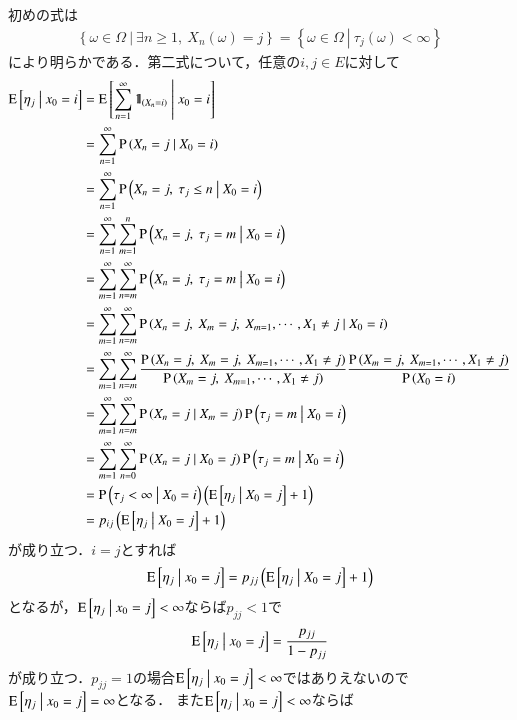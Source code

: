 	\begin{prf}
		初めの式は
		\begin{align}
			\left\{ \omega \in \Omega\ \left|\ \exists n \geq 1,\ X_n(\omega) = j \right.\right\} = \left\{ \omega \in \Omega\ \left|\ \tau_j(\omega) < \infty \right.\right\}
		\end{align}
		により明らかである．第二式について，任意の$i,j \in E$に対して
		\begin{align}
			\cexp{\eta_j}{x_0 = i} &= \cexp{\sum_{n=1}^{\infty} \defunc_{(X_n = i)} }{x_0 = i} \\
			&= \sum_{n=1}^{\infty} \cprob{X_n = j}{X_0 = i} \\
			&= \sum_{n=1}^{\infty} \cprob{X_n = j,\ \tau_j \leq n}{X_0 = i} \\
			&= \sum_{n=1}^{\infty} \sum_{m=1}^{n} \cprob{X_n = j,\ \tau_j = m}{X_0 = i} \\
			&= \sum_{m=1}^{\infty} \sum_{n=m}^{\infty} \cprob{X_n = j,\ \tau_j = m}{X_0 = i} \\
			&= \sum_{m=1}^{\infty} \sum_{n=m}^{\infty} \cprob{X_n = j,\ X_m = j,\ X_{m=1},\cdots,X_1 \neq j}{X_0 = i} \\
			&= \sum_{m=1}^{\infty} \sum_{n=m}^{\infty} \frac{\prob{X_n = j,\ X_m = j,\ X_{m=1},\cdots,X_1 \neq j}}{\prob{X_m = j,\ X_{m=1},\cdots,X_1 \neq j}}
				\frac{\prob{X_m = j,\ X_{m=1},\cdots,X_1 \neq j}}{\prob{X_0 = i}} \\
			&= \sum_{m=1}^{\infty} \sum_{n=m}^{\infty} \cprob{X_n = j}{X_m = j} \cprob{\tau_j = m}{X_0 = i} \\
			&= \sum_{m=1}^{\infty} \sum_{n=0}^{\infty} \cprob{X_n = j}{X_0 = j} \cprob{\tau_j = m}{X_0 = i} \\
			&= \cprob{\tau_j < \infty}{X_0 = i} \left( \cexp{\eta_j}{X_0 = j} + 1 \right) \\
			&= p_{ij} \left( \cexp{\eta_j}{X_0 = j} + 1 \right)
		\end{align}
		が成り立つ．$i = j$とすれば
		\begin{align}
			\operatorname{E} \left[ \eta_j \ \middle|\ x_0 = j \right] = p_{jj} \left( \operatorname{E} \left[ \eta_j \ \middle|\ X_0 = j \right] + 1 \right)
		\end{align}
		となるが，$\operatorname{E} \left[ \eta_j \ \middle|\ x_0 = j \right] < \infty$ならば$p_{jj} < 1$で
		\begin{align}
			\operatorname{E} \left[ \eta_j \ \middle|\ x_0 = j \right] = \frac{p_{jj}}{1-p_{jj}}
		\end{align}
		が成り立つ．$p_{jj} = 1$の場合$\operatorname{E} \left[ \eta_j \ \middle|\ x_0 = j \right] < \infty$ではありえないので$\operatorname{E} \left[ \eta_j \ \middle|\ x_0 = j \right] = \infty$となる．
		また$\operatorname{E} \left[ \eta_j \ \middle|\ x_0 = j \right] < \infty$ならば
		\begin{align}

\end{align}
\end{prf}

